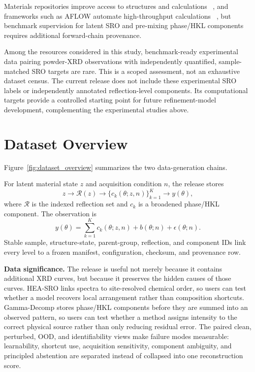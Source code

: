 \documentclass[sigconf,review,anonymous]{acmart}
\newenvironment{revision}{\ifdefined\markedcopy\color{red!70!black}\else\color{black}\fi}{}
\begin{document}
Materials repositories improve access to structures and calculations
~\cite{belsky2002icsd,saal2013oqmd,draxl2019nomad,choudhary2020jarvis},
and frameworks such as AFLOW automate high-throughput calculations
~\cite{curtarolo2012aflowlib},
but benchmark supervision for latent SRO and pre-mixing phase/HKL components
requires additional forward-chain provenance.

\begin{revision}
Among the resources considered in this study, benchmark-ready experimental
data pairing powder-XRD observations with independently quantified,
sample-matched SRO targets are rare. This is a scoped assessment, not an
exhaustive dataset census. The current release does not include these
experimental SRO labels or independently annotated reflection-level components.
Its computational targets provide a controlled starting point for future
refinement-model development, complementing the experimental studies above.
\end{revision}

\section{Dataset Overview}

Figure~\ref{fig:dataset_overview} summarizes the two data-generation chains.

For latent material state $z$ and acquisition condition $n$, the release stores
\begin{equation}
z\longrightarrow\mathcal{R}(z)\longrightarrow
\{c_k(\theta;z,n)\}_{k=1}^{K}\longrightarrow y(\theta),
\end{equation}
where $\mathcal{R}$ is the indexed reflection set and $c_k$ is a broadened
phase/HKL component. The observation is
\begin{equation}
y(\theta)=\sum_{k=1}^{K}c_k(\theta;z,n)+b(\theta;n)+\epsilon(\theta;n).
\end{equation}
Stable sample, structure-state, parent-group, reflection, and component IDs link
every level to a frozen manifest, configuration, checksum, and provenance row.

\textbf{Data significance.}
The release is useful not merely because it contains additional XRD curves, but
because it preserves the hidden causes of those curves. HEA-SRO links spectra to
site-resolved chemical order, so users can test whether a model recovers local
arrangement rather than composition shortcuts. Gamma-Decomp stores phase/HKL
components before they are summed into an observed pattern, so users can test
whether a method assigns intensity to the correct physical source rather than
only reducing residual error. The paired clean, perturbed, OOD, and
identifiability views make failure modes measurable: learnability, shortcut use,
acquisition sensitivity, component ambiguity, and principled abstention are
separated instead of collapsed into one reconstruction score.
\end{document}
